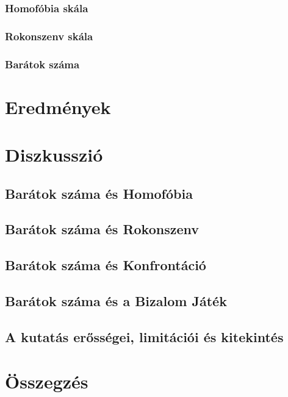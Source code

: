 \subsubsection{Homofóbia skála}
\subsubsection{Rokonszenv skála}
\subsubsection{Barátok száma}
\section{Eredmények}
\section{Diszkusszió}
\subsection{Barátok száma és Homofóbia}
\subsection{Barátok száma és Rokonszenv}
\subsection{Barátok száma és Konfrontáció}
\subsection{Barátok száma és a Bizalom Játék}
\subsection{A kutatás erősségei, limitációi és kitekintés}

\section{Összegzés}

